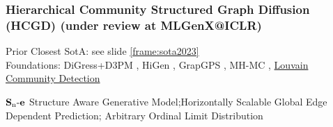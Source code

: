 \documentclass[./presentation.tex]{subfiles}
\begin{document}
\begin{frame}[t,label=hcgdintro]
  \frametitle{\textbf{H}ierarchical \textbf{C}ommunity Structured \textbf{G}raph \textbf{D}iffusion (HCGD) (under review at MLGenX@ICLR)}
  \vspace{-1cm}
  \begin{priorart}
    Prior Closest SotA: see slide \ref{frame:sota2023}\\%
    Foundations: DiGress+D3PM \citep{krawczukGGGANGeometricGraph2020,austinStructuredDenoisingDiffusion2021e}, HiGen \citep{karamiHiGenHierarchicalGraph2023a}, GrapGPS \citep{rampasekRecipeGeneralPowerful2022b}, MH-MC \citep{metropolisEquationStateCalculations1953a}, 
    \hyperlink{hcgdbackuplouvain}{Louvain Community Detection} \citep{newmanFindingEvaluatingCommunity2004,blondelFastUnfoldingCommunities2008d}
  \end{priorart}
  \begin{contributions}
    $\operatorname{\mathbf{S}_n\mathbf{-e}}$ Structure Aware Generative Model;Horizontally Scalable Global Edge Dependent Prediction; Arbitrary Ordinal Limit Distribution
  \end{contributions}
      \begin{outcomes}
      \end{outcomes} 
\end{frame}
\end{document}
